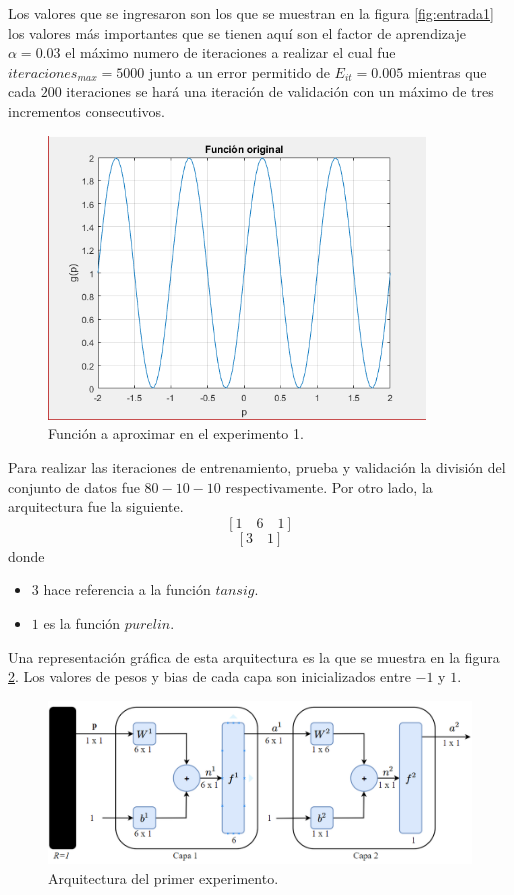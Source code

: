 Los valores que se ingresaron son los que se muestran en la figura \ref{fig:entrada1} los valores más importantes que se tienen aquí son el factor de aprendizaje $\alpha=0.03$ el máximo numero de iteraciones a realizar el cual fue $iteraciones_{max} = 5000$ junto a un error permitido de $E_{it} = 0.005$ mientras que cada $200$ iteraciones se hará una iteración de validación con un máximo de tres incrementos consecutivos.
\begin{figure}[H]
    \begin{center}
        \includegraphics[width=10cm]{1/original.png}
        \caption{Función a aproximar en el experimento 1.}
        \label{fig:original1}
    \end{center}
\end{figure}
Para realizar las iteraciones de entrenamiento, prueba y validación la división del conjunto de datos fue $80-10-10$ respectivamente. Por otro lado, la arquitectura fue la siguiente.
\[ \left[ 1 \quad 6 \quad 1 \right] \]
\[ \left[ 3 \quad 1 \right] \]
donde
\begin{itemize}
    \item $3$ hace referencia a la función $tansig$.
    \item $1$ es la función $purelin$.
\end{itemize}
Una representación gráfica de esta arquitectura es la que se muestra en la figura \ref{fig:arqui1}. Los valores de pesos y bias de cada capa son inicializados entre $-1$ y $1$.
\begin{figure}[H]
    \begin{center}
        \includegraphics[width=14cm]{img/arqui1.png}
        \caption{Arquitectura del primer experimento.}
        \label{fig:arqui1}
    \end{center}
\end{figure}
